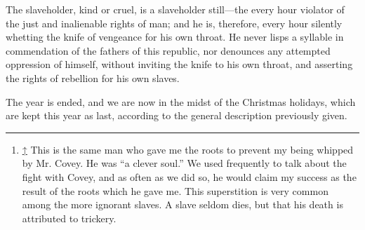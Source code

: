 The slaveholder, kind or cruel, is a slaveholder still---the every hour
violator of the just and inalienable rights of man; and he is,
therefore, every hour silently whetting the knife of vengeance for his
own throat. He never lisps a syllable in commendation of the fathers of
this republic, nor denounces any attempted oppression of himself,
without inviting the knife to his {}own throat, and asserting the rights
of rebellion for his own slaves.

The year is ended, and we are now in the midst of the Christmas
holidays, which are kept this year as last, according to the general
description previously given.

\begin{center}\rule{0.5\linewidth}{\linethickness}\end{center}

\begin{enumerate}
\item
  \hypertarget{cite_note-1}{}

  {\protect\hyperlink{cite_ref-1}{↑}} {This is the same man who gave me
  the roots to prevent my being whipped by Mr. Covey. He was ``a clever
  soul.'' We used frequently to talk about the fight with Covey, and as
  often as we did so, he would claim my success as the result of the
  roots which he gave me. This superstition is very common among the
  more ignorant slaves. A slave seldom dies, but that his death is
  attributed to trickery.}
\end{enumerate}
